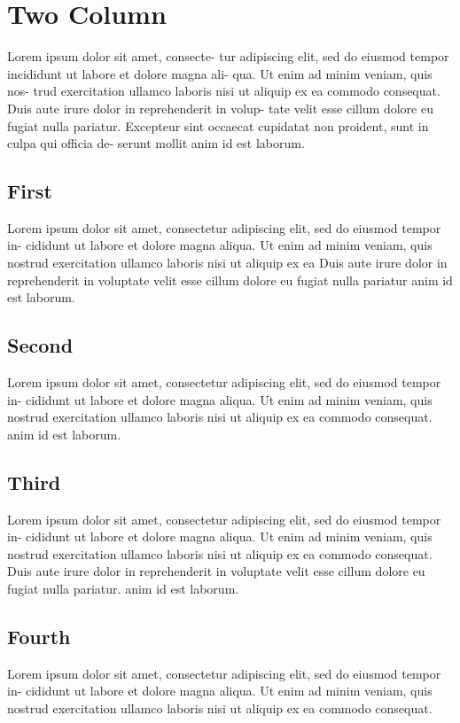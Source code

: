 


\chapter{Two Column}

\begin{multicols}{2}

Lorem ipsum dolor sit amet, consecte-
tur adipiscing elit, sed do eiusmod tempor
incididunt ut labore et dolore magna ali-
qua. Ut enim ad minim veniam, quis nos-
trud exercitation ullamco laboris nisi ut
aliquip ex ea commodo consequat. Duis
aute irure dolor in reprehenderit in volup-
tate velit esse cillum dolore eu fugiat nulla
pariatur. Excepteur sint occaecat cupidatat
non proident, sunt in culpa qui officia de-
serunt mollit anim id est laborum.
\section{First}
Lorem ipsum dolor sit amet, consectetur
adipiscing elit, sed do eiusmod tempor in-
cididunt ut labore et dolore magna aliqua.
Ut enim ad minim veniam, quis nostrud
exercitation ullamco laboris nisi ut aliquip
ex ea  Duis aute irure
dolor in reprehenderit in voluptate velit esse
cillum dolore eu fugiat nulla pariatur
anim id est laborum.
\section{Second}
Lorem ipsum dolor sit amet, consectetur
adipiscing elit, sed do eiusmod tempor in-
cididunt ut labore et dolore magna aliqua.
Ut enim ad minim veniam, quis nostrud
exercitation ullamco laboris nisi ut aliquip
ex ea commodo consequat. 
anim id est laborum.
\section{Third}
Lorem ipsum dolor sit amet, consectetur
adipiscing elit, sed do eiusmod tempor in-
cididunt ut labore et dolore magna aliqua.
Ut enim ad minim veniam, quis nostrud
exercitation ullamco laboris nisi ut aliquip
ex ea commodo consequat. Duis aute irure
dolor in reprehenderit in voluptate velit esse
cillum dolore eu fugiat nulla pariatur.
anim id est laborum.
\section{Fourth}
Lorem ipsum dolor sit amet, consectetur
adipiscing elit, sed do eiusmod tempor in-
cididunt ut labore et dolore magna aliqua.
Ut enim ad minim veniam, quis nostrud
exercitation ullamco laboris nisi ut aliquip
ex ea commodo consequat.
\end{multicols}
